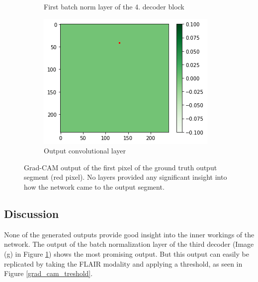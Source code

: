 \begin{figure}[H]
\begin{subfigure}{.32\textwidth}
        \caption{First batch norm layer of the 4. decoder block}
    \end{subfigure}\hfill%
    \begin{subfigure}{.32\textwidth}
        \centering
        \includegraphics[width=\linewidth]{chapters/04_segmentation/images/grad_cam_36.png}
        \caption{Output convolutional layer}
    \end{subfigure}
    \caption{Grad-CAM output of the first pixel of the ground truth output segment (red pixel). No layers provided any significant insight into how the network came to the output segment.}
    \label{grad_cam_brats_result}
\end{figure}

\subsection{Discussion}
None of the generated outputs provide good insight into the inner workings of the network. The output of the batch normalization layer of the third decoder (Image (g) in Figure \ref{grad_cam_brats_result}) shows the most promising output. But this output can easily be replicated by taking the FLAIR modality and applying a threshold, as seen in Figure \ref{grad_cam_treshold}.

